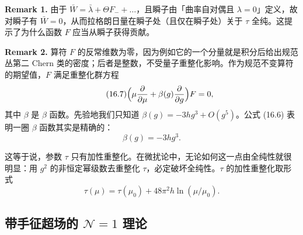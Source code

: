 \textbf{Remark 1.} 由于 $\bar W=\bar\lambda+\Theta F_-+\dots$，且瞬子由「曲率自对偶且 $\lambda=0$」定义，故对瞬子有 $\bar W=0$，从而拉格朗日量在瞬子处（且仅在瞬子处）关于 $\tau$ 全纯。这提示了为什么函数 $F$ 应当从瞬子获得贡献。

\textbf{Remark 2.} 算符 $F$ 的反常维数为零，因为例如它的一个分量就是积分后给出规范丛第二 Chern 类的密度；后者是整数，不受量子重整化影响。作为规范不变算符的期望值，$F$ 满足重整化群方程
\begin{equation}
  \tag{16.7}
  \label{eq:16-7}
  \Bigl(\mu\frac{\partial}{\partial\mu}+\beta(g)\frac{\partial}{\partial g}\Bigr)F=0,
\end{equation}
其中 $\beta$ 是 $\beta$ 函数。先验地我们只知道 $\beta(g)=-3hg^3+O(g^5)$。公式 (16.6) 表明一圈 $\beta$ 函数其实是精确的：
\begin{equation}
  \tag{16.8}
  \label{eq:16-8}
  \beta(g)=-3hg^3 .
\end{equation}



这等于说，参数 $\tau$ 只有加性重整化。在微扰论中，无论如何这一点由全纯性就很明显：用 $g^2$ 的非恒定幂级数去重整化 $\tau$，必定破坏全纯性。$\tau$ 的加性重整化取形式
\[
\tau(\mu)=\tau(\mu_0)+48\pi^2h\ln(\mu/\mu_0).
\]


\subsection{带手征超场的 $\mathcal{N}=1$ 理论}

